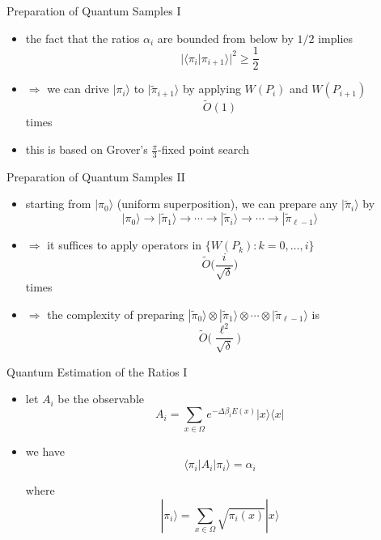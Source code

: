 \documentclass[slideColor]{prosper}
\renewcommand{\>}{\rangle}
\newcommand{\<}{\langle}
\begin{document}
\begin{slide}{Preparation of Quantum Samples I}
\begin{itemize}
\item the fact that the ratios $\alpha_i$ are bounded from below by $1/2$ implies 
\[
|\<\pi_i|\pi_{i+1}\>|^2 \ge \frac{1}{2}
\]

\medskip
\item $\Rightarrow$ we can drive $|\pi_i\>$ to $|\tilde{\pi}_{i+1}\>$ by applying $W(P_i)$ and $W(P_{i+1})$
\[
\tilde{O}(1)
\] 
times

\medskip
\item this is based on Grover's $\frac{\pi}{3}$-fixed point search

\end{itemize}
\end{slide}


\begin{slide}{Preparation of Quantum Samples II}
\begin{itemize}
\item starting from $|\pi_0\>$ (uniform superposition), we can prepare any $|\tilde{\pi}_i\>$ by
\[
|\pi_0\> \rightarrow |\tilde{\pi}_1\> \rightarrow \cdots \rightarrow |\tilde{\pi}_i\> \rightarrow \cdots \rightarrow |\tilde{\pi}_{\ell-1}\>
\]

\medskip
\item $\Rightarrow$ it suffices to apply operators in $\{W(P_k) : k = 0,\ldots,i\}$
\[
\tilde{O}\Big(\frac{i}{\sqrt{\delta}}\Big)
\]
times

\medskip
\item $\Rightarrow$ the complexity of preparing $|\tilde{\pi}_0\>\otimes |\tilde{\pi}_1\> \otimes \cdots \otimes |\tilde{\pi}_{\ell-1}\>$ is
\[
\tilde{O}\Big(
\frac{\ell^2}{\sqrt{\delta}}
\Big)
\]
\end{itemize}
\end{slide}


\begin{slide}{Quantum Estimation of the Ratios I}
\begin{itemize}
\item let $A_i$ be the observable
\[
A_i = \sum_{x\in\Omega} e^{-\Delta\beta_i E(x)} |x\>\<x|
\]

\medskip
\item we have 
\[
\<\pi_i|A_i|\pi_i\> = \alpha_i
\]

\medskip
where 
\[
|\pi_i\> = \sum_{x\in\Omega} \sqrt{\pi_i(x)} |x\>
\]

\end{itemize}
\end{slide}
\end{document}
